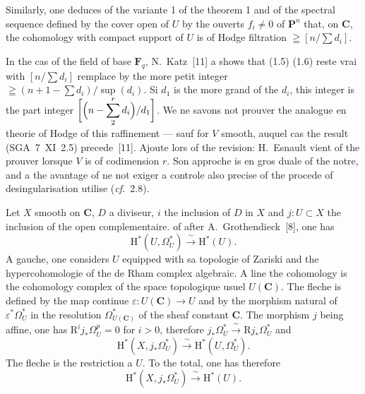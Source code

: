 \documentclass[12pt,a4paper]{article}
\theoremstyle{plain}
\theoremstyle{definition}
\begin{document}
Similarly, one deduces of the variante 1 of the theorem 1 and of the spectral sequence defined by the cover open of $U$ by the ouverts $f_i \neq 0$ of $\mathbf{P}^n$ that, on $\mathbf{C}$, the cohomology with compact support of $U$ is of Hodge filtration $\geqq [n/\sum d_i]$.

In the cas of the field of base $\mathbf{F}_q$, N.~Katz~[11] a shows that (1.5) (1.6) reste vrai with $[n/\sum d_i]$ remplace by the more petit integer $\geqq (n+1-\sum d_i)/\sup(d_i)$. Si $d_1$ is the more grand of the $d_i$, this integer is the part integer $\biggl[\Bigl(n-\displaystyle\sum_2^r d_i\Bigr)/d_1\biggr]$. We ne savons not prouver the analogue en theorie of Hodge of this raffinement --- sauf for $V$ smooth, auquel cas the result (SGA~7~XI~2.5) precede~[11]. Ajoute lors of the revision: H.~Esnault vient of the prouver lorsque $V$ is of codimension $r$. Son approche is en gros duale of the notre, and a the avantage of ne not exiger a controle also precise of the procede of desingularisation utilise (\textit{cf.}~2.8).

\medskip

Let $X$ smooth on $\mathbf{C}$, $D$ a diviseur, $i$ the inclusion of $D$ in $X$ and $j : U \subset X$ the inclusion of the open complementaire. of after A.\ Grothendieck~[8], one has
\begin{equation}\label{eq:1.7}
\mathrm{H}^*(U, \Omega_U^*) \xrightarrow{\;\sim\;} \mathrm{H}^*(U).
\tag{1.7}
\end{equation}
A gauche, one considers $U$ equipped with sa topologie of Zariski and the hypercohomologie of the de Rham complex algebraic. A line the cohomology is the cohomology complex of the space topologique usuel $U(\mathbf{C})$. The fleche is defined by the map continue $\varepsilon : U(\mathbf{C}) \to U$ and by the morphism natural of $\varepsilon^* \Omega_U^*$ in the resolution $\Omega_{U(\mathbf{C})}^*$ of the sheaf constant $\mathbf{C}$. The morphism $j$ being affine, one has $\mathrm{R}^i j_* \Omega_U^p = 0$ for $i > 0$, therefore $j_* \Omega_U^* \xrightarrow{\;\sim\;} \mathrm{R}j_* \Omega_U^*$ and
\begin{equation}\label{eq:1.8}
\mathrm{H}^*(X, j_* \Omega_U^*) \xrightarrow{\;\sim\;} \mathrm{H}^*(U, \Omega_U^*).
\tag{1.8}
\end{equation}
The fleche is the restriction a $U$. To the total, one has therefore
\begin{equation}\label{eq:1.9}
\mathrm{H}^*(X, j_* \Omega_U^*) \xrightarrow{\;\sim\;} \mathrm{H}^*(U).
\tag{1.9}
\end{equation}
\end{document}

